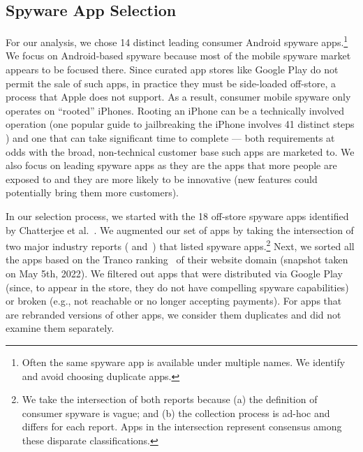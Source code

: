 \subsection{Spyware App Selection}
\label{subsec:app_selection}



For our analysis, we chose 14 distinct leading consumer Android spyware
apps.\footnote{Often the same spyware app is available under multiple
  names. We identify and avoid choosing duplicate apps.}  We focus on
Android-based spyware because most of the mobile spyware market
appears to be focused there. Since curated app stores like Google Play do not permit
the sale of such apps, in practice they must be side-loaded off-store, a process
that Apple does not support.  As a result, consumer mobile spyware only operates on ``rooted'' iPhones.  Rooting an iPhone can be a
technically involved operation (one popular guide to jailbreaking the
iPhone involves 41 distinct steps \cite{howToJailbreakIphone:online}) and one that can take significant
time to complete --- both requirements at odds with the broad,
non-technical customer base such apps are marketed to. We also focus on leading spyware apps as they are the apps that more people are exposed to and they are more likely to be innovative (new features could potentially bring them more customers).

In our selection process, we started with the 18 off-store spyware apps identified by Chatterjee et al.~\cite{chatterjee2018spyware}. We augmented our set of apps by taking the intersection of two major industry reports (\cite{esetandr4:online} and~\cite{Tekstalk86:online}) that listed spyware apps.\footnote{We take the intersection of both reports because (a) the definition of consumer spyware is vague; and (b) the collection process is ad-hoc and differs for each report. Apps in the intersection represent consensus among these disparate classifications.} Next, we sorted all the apps based on the Tranco ranking~\cite{pochat2018tranco} of their website domain (snapshot taken on May 5th, 2022).  We filtered out apps that were distributed via Google Play (since, to appear in
the store, they do not have compelling spyware capabilities)
or broken (e.g., not reachable or no longer accepting payments).
For apps that are rebranded versions of other apps, we consider them duplicates and did not examine them separately.

